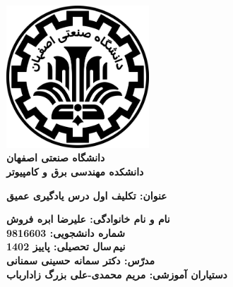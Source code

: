 \begin{titlepage}
\begin{center}
\includegraphics[width=0.4\textwidth]{figures/IUT Logo.png}\\
        
\LARGE
\textbf{دانشگاه صنعتی اصفهان}\\
\textbf{دانشکده مهندسی برق و کامپیوتر}\\
        
\vfill
        
\huge
\textbf{عنوان: تکلیف اول درس یادگیری عمیق}\\
        
\vfill
        
\LARGE
\textbf{نام و نام خانوادگی: علیرضا ابره فروش}\\
\textbf{شماره دانشجویی: 9816603}\\
\textbf{نیم\,سال تحصیلی: پاییز 1402}\\
\textbf{مدرّس: دکتر سمانه حسینی سمنانی}\\
\textbf{دستیاران آموزشی: مریم محمدی-علی بزرگ زادارباب}\\
\end{center}
\end{titlepage}
